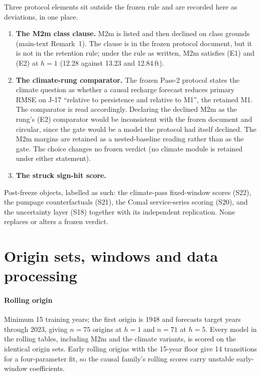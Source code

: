 Three protocol elements sit outside the frozen rule and are recorded here as deviations, in one place.
\begin{enumerate}[leftmargin=2em]
\item \textbf{The M2m class clause.} M2m is listed and then declined on class grounds (main-text Remark~1). The clause is in the frozen protocol document, but it is not in the retention rule; under the rule as written, M2m satisfies (E1) and (E2) at $h=1$ (12.28 against 13.23 and 12.84\,ft).
\item \textbf{The climate-rung comparator.} The frozen Pass-2 protocol states the climate question as whether a causal recharge forecast reduces primary RMSE on J-17 ``relative to persistence and relative to M1'', the retained M1. The comparator is read accordingly. Declaring the declined M2m as the rung's (E2) comparator would be inconsistent with the frozen document and circular, since the gate would be a model the protocol had itself declined. The M2m margins are retained as a nested-baseline reading rather than as the gate. The choice changes no frozen verdict (no climate module is retained under either statement).
\item \textbf{The struck sign-hit score.}
\end{enumerate}

Post-freeze objects, labelled as such: the climate-pass fixed-window scores (S22), the pumpage counterfactuals (S21), the Comal service-series scoring (S20), and the uncertainty layer (S18) together with its independent replication. None replaces or alters a frozen verdict.

\section{Origin sets, windows and data processing}\label{si:edworigins}

\paragraph{Rolling origin} Minimum 15 training years; the first origin is 1948 and forecasts target years through 2023, giving $n=75$ origins at $h=1$ and $n=71$ at $h=5$. Every model in the rolling tables, including M2m and the climate variants, is scored on the identical origin sets. Early rolling origins with the 15-year floor give 14 transitions for a four-parameter fit, so the causal family's rolling scores carry unstable early-window coefficients.


